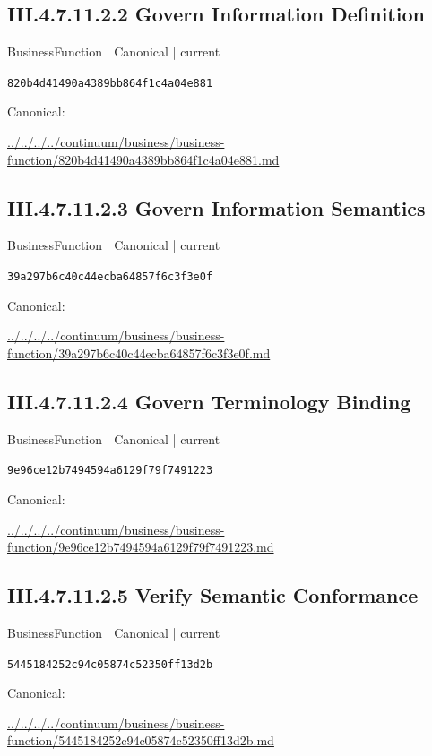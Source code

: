 \documentclass[10pt,a4paper]{article}
\begin{document}
\subsection*{III.4.7.11.2.2 Govern Information Definition}
\label{element-820b4d41490a4389bb864f1c4a04e881}
{\small BusinessFunction | Canonical | current}\par
\texttt{820b4d41490a4389bb864f1c4a04e881}\par
Canonical: \par
{\footnotesize\url{../../../../continuum/business/business-function/820b4d41490a4389bb864f1c4a04e881.md}}\par
\subsection*{III.4.7.11.2.3 Govern Information Semantics}
\label{element-39a297b6c40c44ecba64857f6c3f3e0f}
{\small BusinessFunction | Canonical | current}\par
\texttt{39a297b6c40c44ecba64857f6c3f3e0f}\par
Canonical: \par
{\footnotesize\url{../../../../continuum/business/business-function/39a297b6c40c44ecba64857f6c3f3e0f.md}}\par
\subsection*{III.4.7.11.2.4 Govern Terminology Binding}
\label{element-9e96ce12b7494594a6129f79f7491223}
{\small BusinessFunction | Canonical | current}\par
\texttt{9e96ce12b7494594a6129f79f7491223}\par
Canonical: \par
{\footnotesize\url{../../../../continuum/business/business-function/9e96ce12b7494594a6129f79f7491223.md}}\par
\subsection*{III.4.7.11.2.5 Verify Semantic Conformance}
\label{element-5445184252c94c05874c52350ff13d2b}
{\small BusinessFunction | Canonical | current}\par
\texttt{5445184252c94c05874c52350ff13d2b}\par
Canonical: \par
{\footnotesize\url{../../../../continuum/business/business-function/5445184252c94c05874c52350ff13d2b.md}}\par
\end{document}
